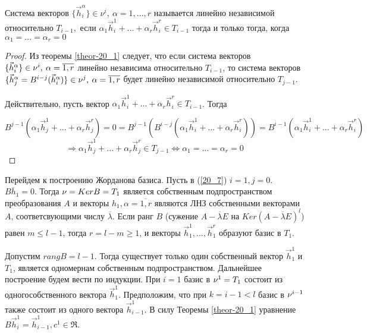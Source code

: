 \begin{definition}
Система векторов $\{\vec{h}_i^{\alpha}\} \in \nu^i, \: \alpha = 1,...,r$ называется линейно  независимой относительно $T_{i - 1},$ если $\alpha_1 \vec{h}_i^1 + ... + \alpha_r \vec{h}_i^r \in T_{i-1}$ тогда и только тогда, когда $\alpha_1 = ... = \alpha_r = 0$
\begin{proof}
Из теоремы \ref{theor-20_1} следует, что если система векторов $\{\vec{h}_i^{\alpha}\} \in \nu^i, \: \alpha = \overline{1,r}$ линейно независима относительно $T_{i-1}$, то система векторов $\{\vec{h}_j^{\alpha} = B^{i-j} (\vec{h}^\alpha_i ) \} \in  \nu^j, \: \alpha = \overline{1,r}$ будет линейно независимой относительно $T_{j-1}.$

Действительно, пусть вектор $\alpha_1 \vec{h}_i^1 + ... + \alpha_r \vec{h}_i^r \in T_{i-1}$. Тогда

\[B^{j-1} (\alpha_1 \vec{h}_j^1 + ... + \alpha_r \vec{h}_j^r) = 0= B^{j - 1} ( B^{i - j} (\alpha_1 \vec{h}_i^1 + ... + \alpha_r \vec{h}_i^r)) = B^{i - 1}(\alpha_1 \vec{h}_i^1 + ... + \alpha_r \vec{h}_i^r)\] 
\[\Rightarrow \alpha_1 \vec{h}_j^1 + ... + \alpha_r \vec{h}_j^r \in T_{j-1} \Leftrightarrow \alpha_1 = ... = \alpha_r = 0\]
\end{proof}
\end{definition}

Перейдем к построению Жорданова базиса. Пусть в (\ref{20_7}) $i = 1, j = 0$. $B\overline{h}_1 = 0$. Тогда $\nu = Ker B = T_1$ является собственным подпространством преобразования $A$ и векторы $h_1, \alpha = \overline{1,r}$ являются ЛНЗ собственными векторами $A$, соответсвующими числу $\overline{\lambda}$. Если ранг $B$ (сужение $A - \overline{\lambda} E$ на $Ker (A - \overline{\lambda} E)^l$) равен $m \leq l - 1$, тогда $r = l - m \geq 1$, и векторы $\vec{h}_1^1, ... , \vec{h}_1^r$ образуют базис в $T_1$.

Допустим $rangB = l - 1$. Тогда существует только один собственный вектор $\vec{h}_1^1$ и $T_1$, является одномернам собственным подпространством. Дальнейшее построение будем вести по индукции. При $i = 1$ базис в $\nu^1 = T_1$ состоит из одногособственного вектора $\vec{h}_1^1$. Предположим, что при $k = i - 1 < l$ базис в $\nu^{i-1}$ также состоит из одного вектора $\vec{h}_{i - 1}^1$. В силу Теоремы \ref{theor-20_1} уравнение $B\vec{h}_i^1 = \vec{h}_{i-1}^1, c^1\in \Re$.

